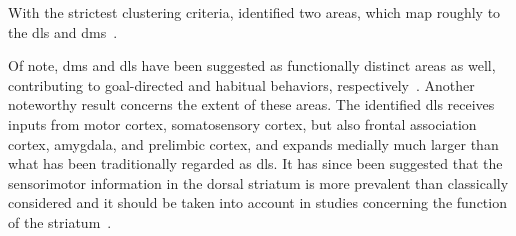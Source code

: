 With the strictest clustering criteria, \citeauthor{Hunnicutt2016} identified two areas, which map roughly to the \gls{dls} and \gls{dms}\footnotemark~\cite{Hunnicutt2016}.

Of note, \gls{dms} and \gls{dls} have been suggested as functionally distinct areas as well, contributing to goal-directed and habitual behaviors, respectively~\cite{Yin2006NatRevNeurosci}.
Another noteworthy result concerns the extent of these areas.
The identified \gls{dls} receives inputs from motor cortex, somatosensory cortex, but also frontal association cortex, amygdala, and prelimbic cortex, and expands medially much larger than what has been traditionally regarded as \gls{dls}.
It has since been suggested that the sensorimotor information in the dorsal striatum is more prevalent than classically considered and it should be taken into account in studies concerning the function of the striatum~\cite{Robbe2018}.


